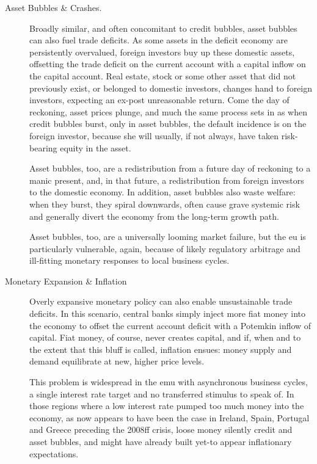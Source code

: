 \begin{description}
	\item[Asset Bubbles \& Crashes.]
	Broadly similar, and often concomitant to credit bubbles, asset bubbles can also fuel trade deficits.
	As some assets in the deficit economy are persistently overvalued, foreign investors buy up these domestic assets, offsetting the trade deficit on the current account with a capital inflow on the capital account.
	Real estate, stock or some other asset that did not previously exist, or belonged to domestic investors, changes hand to foreign investors, expecting an ex-post unreasonable return.
	Come the day of reckoning, asset prices plunge, and much the same process sets in as when credit bubbles burst, only in asset bubbles, the default incidence is on the foreign investor, because she will usually, if not always, have taken risk-bearing equity in the asset.

	Asset bubbles, too, are a redistribution from a future day of reckoning to a manic present, and, in that future, a redistribution from foreign investors to the domestic economy.
	In addition, asset bubbles also waste welfare:
	when they burst, they spiral downwards, often cause grave systemic risk and generally divert the economy from the long-term growth path.

	Asset bubbles, too, are a universally looming market failure, but the \gls{eu} is particularly vulnerable, again, because of likely regulatory arbitrage and ill-fitting monetary responses to local business cycles.%

	\item[Monetary Expansion \& Inflation]
	Overly expansive monetary policy can also enable unsustainable trade deficits.
	In this scenario, central banks simply inject more fiat money into the economy to offset the current account deficit with a Potemkin inflow of capital.
	Fiat money, of course, never creates capital, and if, when and to the extent that this bluff is called, inflation ensues:
	money supply and demand equilibrate at new, higher price levels.

	This problem is widespread in the \gls{emu} with asynchronous business cycles, a single interest rate target and no transferred stimulus to speak of.
	In those regions where a low interest rate pumped too much money into the economy, as now appears to have been the case in Ireland, Spain, Portugal and Greece preceding the 2008ff crisis, loose money silently credit and asset bubbles, and might have already built yet-to appear inflationary expectations.


\end{description}
